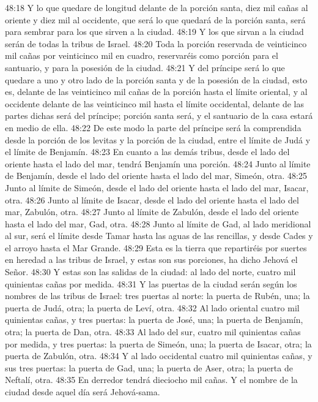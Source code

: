 48:18 Y lo que quedare de longitud delante de la porción santa, diez mil cañas   al oriente y diez mil al occidente, que será lo que quedará de la porción santa, será para sembrar para los que sirven a la ciudad.  
48:19 Y los que sirvan a la ciudad serán de todas la tribus de Israel.  
48:20 Toda la porción reservada de veinticinco mil cañas   por veinticinco mil en cuadro, reservaréis como porción para el santuario, y para la posesión de la ciudad.  
48:21 Y del príncipe será lo que quedare a uno y otro lado de la porción santa y de la posesión de la ciudad, esto es, delante de las veinticinco mil cañas   de la porción hasta el límite oriental, y al occidente delante de las veinticinco mil hasta el límite occidental, delante de las partes dichas será del príncipe; porción santa será, y el santuario de la casa estará en medio de ella.  
48:22 De este modo la parte del príncipe será la comprendida desde la porción de los levitas y la porción de la ciudad, entre el límite de Judá y el límite de Benjamín.  
48:23 En cuanto a las demás tribus, desde el lado del oriente hasta el lado del mar, tendrá Benjamín una porción.  
48:24 Junto al límite de Benjamín, desde el lado del oriente hasta el lado del mar, Simeón, otra.  
48:25 Junto al límite de Simeón, desde el lado del oriente hasta el lado del mar, Isacar, otra.  
48:26 Junto al límite de Isacar, desde el lado del oriente hasta el lado del mar, Zabulón, otra.  
48:27 Junto al límite de Zabulón, desde el lado del oriente hasta el lado del mar, Gad, otra.  
48:28 Junto al límite de Gad, al lado meridional al sur, será el límite desde Tamar hasta las aguas de las rencillas, y desde Cades y el arroyo hasta el Mar Grande.  
48:29 Esta es la tierra que repartiréis por suertes en heredad a las tribus de Israel, y estas son sus porciones, ha dicho Jehová el Señor.  
48:30 Y estas son las salidas de la ciudad: al lado del norte, cuatro mil quinientas cañas   por medida.  
48:31 Y las puertas de la ciudad serán según los nombres de las tribus de Israel: tres puertas al norte: la puerta de Rubén, una; la puerta de Judá, otra; la puerta de Leví, otra.  
48:32 Al lado oriental cuatro mil quinientas cañas,  y tres puertas: la puerta de José, una; la puerta de Benjamín, otra; la puerta de Dan, otra.  
48:33 Al lado del sur, cuatro mil quinientas cañas   por medida, y tres puertas: la puerta de Simeón, una; la puerta de Isacar, otra; la puerta de Zabulón, otra.  
48:34 Y al lado occidental cuatro mil quinientas cañas,  y sus tres puertas: la puerta de Gad, una; la puerta de Aser, otra; la puerta de Neftalí, otra.  
48:35 En derredor tendrá dieciocho mil cañas.  Y el nombre de la ciudad desde aquel día será Jehová-sama.



